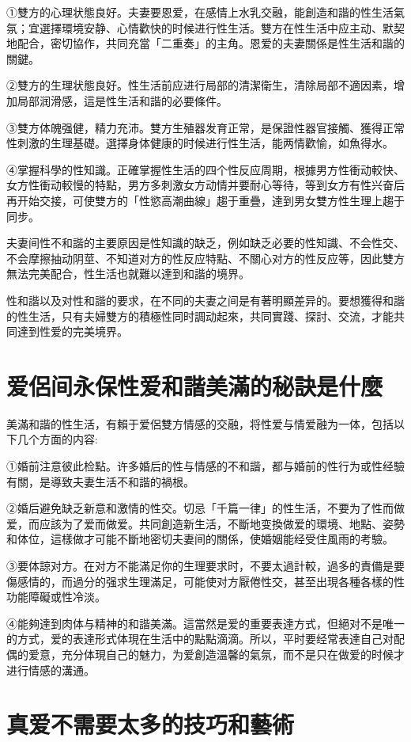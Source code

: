 \documentclass[12pt,UTF8]{ctexbook}
\begin{document}
①雙方的心理状態良好。夫妻要恩爱，在感情上水乳交融，能創造和諧的性生活氣氛；宜選擇環境安静、心情歡快的时候进行性生活。雙方在性生活中应主动、默契地配合，密切協作，共同充當「二重奏」的主角。恩爱的夫妻關係是性生活和諧的關鍵。

②雙方的生理状態良好。性生活前应进行局部的清潔衛生，清除局部不適因素，增加局部润滑感，這是性生活和諧的必要條件。

③雙方体魄强健，精力充沛。雙方生殖器发育正常，是保證性器官接觸、獲得正常性刺激的生理基礎。選擇身体健康的时候进行性生活，能两情歡愉，如魚得水。

④掌握科學的性知識。正確掌握性生活的四个性反应周期，根據男方性衝动較快、女方性衝动較慢的特點，男方多刺激女方动情并要耐心等待，等到女方有性兴奋后再开始交接，可使雙方的「性慾高潮曲線」趨于重疊，達到男女雙方性生理上趨于同步。

夫妻间性不和諧的主要原因是性知識的缺乏，例如缺乏必要的性知識、不会性交、不会摩擦抽动阴莖、不知道对方的性反应特點、不關心对方的性反应等，因此雙方無法完美配合，性生活也就難以達到和諧的境界。

性和諧以及对性和諧的要求，在不同的夫妻之间是有著明顯差异的。要想獲得和諧的性生活，只有夫婦雙方的積極性同时調动起來，共同實踐、探討、交流，才能共同達到性爱的完美境界。

\section{爱侶间永保性爱和諧美滿的秘訣是什麼}

美滿和諧的性生活，有賴于爱侶雙方情感的交融，将性爱与情爱融为一体，包括以下几个方面的内容:

①婚前注意彼此检點。许多婚后的性与情感的不和諧，都与婚前的性行为或性经驗有關，是導致夫妻生活不和諧的禍根。

②婚后避免缺乏新意和激情的性交。切忌「千篇一律」的性生活，不要为了性而做爱，而应該为了爱而做爱。共同創造新生活，不斷地变換做爱的環境、地點、姿勢和体位，這樣做才可能不斷地密切夫妻间的關係，使婚姻能经受住風雨的考驗。

③要体諒对方。在对方不能滿足你的生理要求时，不要太過計較，過多的責備是要傷感情的，而過分的强求生理滿足，可能使对方厭倦性交，甚至出現各種各樣的性功能障礙或性冷淡。

④能夠達到肉体与精神的和諧美滿。這當然是爱的重要表達方式，但絕对不是唯一的方式，爱的表達形式体現在生活中的點點滴滴。所以，平时要经常表達自己对配偶的爱意，充分体現自己的魅力，为爱創造溫馨的氣氛，而不是只在做爱的时候才进行情感的溝通。

\section{真爱不需要太多的技巧和藝術}
\end{document}
